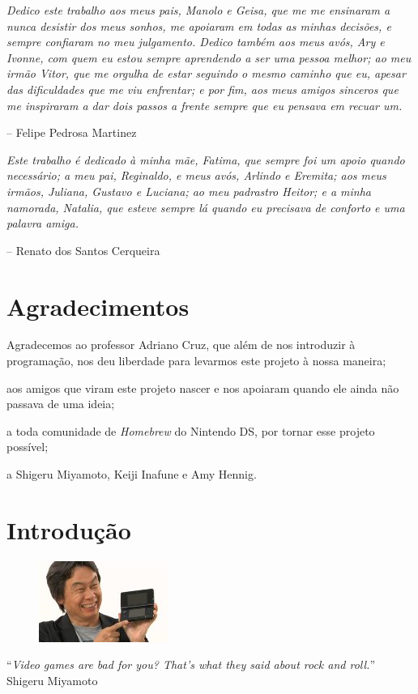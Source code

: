 \documentclass[brazil]{abnt}
\begin{document}
\textit{Dedico este trabalho aos meus pais, Manolo e Geisa, que me me ensinaram a nunca desistir dos meus sonhos, me apoiaram em todas as minhas decisões, e sempre confiaram no meu julgamento. Dedico também aos meus avós, Ary e Ivonne, com quem eu estou sempre aprendendo a ser uma pessoa melhor; ao meu irmão Vitor, que me orgulha de estar seguindo o mesmo caminho que eu, apesar das dificuldades que me viu enfrentar; e por fim, aos meus amigos sinceros que me inspiraram a dar dois passos a frente sempre que eu pensava em recuar um.}

\hfill -- Felipe Pedrosa Martinez

\textit{Este trabalho é dedicado à minha mãe, Fatima, que sempre foi um apoio quando necessário; a meu pai, Reginaldo, e meus avós, Arlindo e Eremita; aos meus irmãos, Juliana, Gustavo e Luciana; ao meu padrastro Heitor; e a minha namorada, Natalia, que esteve sempre lá quando eu precisava de conforto e uma palavra amiga.}

\hfill -- Renato dos Santos Cerqueira

\chapter*{Agradecimentos}

Agradecemos ao professor Adriano Cruz, que além de nos introduzir à programação, nos deu liberdade para levarmos este projeto à nossa maneira;

aos amigos que viram este projeto nascer e nos apoiaram quando ele ainda não passava de uma ideia;

a toda comunidade de \textit{Homebrew} do Nintendo DS, por tornar esse projeto possível;

a Shigeru Miyamoto, Keiji Inafune e Amy Hennig.

\tableofcontents{}
\listoffigures

\chapter{Introdução\label{cap:introducao}}

\vfill{}
\begin{flushright}{}
\begin{figure}[h!]
\hfill\includegraphics{imgs/shigeru.jpg}
\end{figure}
``\emph{Video games are bad for you? That's what they said about rock and roll.}''\\
{\small Shigeru Miyamoto}\end{flushright}{\small \par}
\vfill{}
\end{document}
